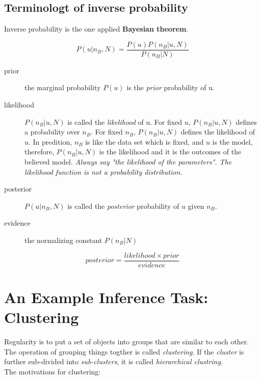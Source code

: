 \documentclass[11pt]{article}
\begin{document}
\subsection{Terminologt of inverse probability}

Inverse probability is the one applied \textbf{Bayesian theorem}.

\begin{equation}
P(u|n_B, N) = \frac{P(u)P(n_B|u, N)}{P(n_B|N)}
\end{equation}

\begin{description}
  \item[prior] the marginal probability $P(u)$ is the \textit{prior} probability of u.

  \item[likelihood] $P(n_B|u, N)$ is called the \textit{likelihood} of u. For fixed $u$, $P(n_B|u, N)$ defines a probability over $n_B$. For fixed $n_B$, $P(n_B|u, N)$ defines the likelihood of $u$. In predition, $n_B$ is like the data set which is fixed, and $u$ is the model, therefore, $P(n_B|u, N)$ is the likelihood and it is the outcomes of the believed model. \textit{Always say "the likelihood of the parameters". The likelihood function is not a probability distribution.}

  \item[posterior] $P(u|n_B, N)$ is called the \textit{posterior} probability of $u$ given $n_B$.

  \item[evidence] the normalizing constant $P(n_B|N)$
\end{description}

\begin{equation}
posterior = \frac{likelihood \times prior}{evidence}
\end{equation}

\newpage

\section{An Example Inference Task: Clustering}
Regularity is to put a set of objects into groups that are similar to each other. The operation of grouping things togther is called \textit{clustering}. If the \textit{cluster} is further sub-divided into \textit{sub-clusters}, it is called \textit{hierarchical clustring}.\\

The motivations for clustering:
\end{document}
